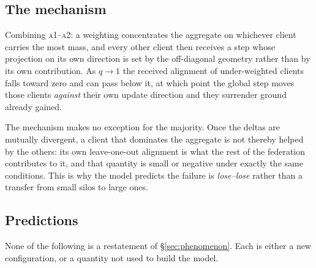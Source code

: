 \subsection{The mechanism}

Combining \textsc{a1}--\textsc{a2}: a weighting concentrates the aggregate on
whichever client carries the most mass, and every other client then receives a
step whose projection on its own direction is set by the off-diagonal geometry
rather than by its own contribution. As $q\to1$ the received alignment of
under-weighted clients falls toward zero and can pass below it, at which point
the global step moves those clients \emph{against} their own update direction
and they surrender ground already gained.

The mechanism makes no exception for the majority. Once the deltas are mutually
divergent, a client that dominates the aggregate is not thereby helped by the
others: its own leave-one-out alignment is what the rest of the federation
contributes to it, and that quantity is small or negative under exactly the
same conditions. This is why the model predicts the failure is
\emph{lose--lose} rather than a transfer from small silos to large ones.

\subsection{Predictions}\label{sec:predictions}

None of the following is a restatement of \S\ref{sec:phenomenon}. Each is
either a new configuration, or a quantity not used to build the model.

